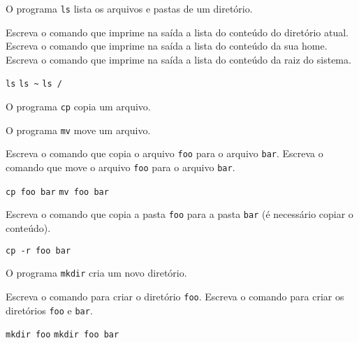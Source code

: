 \begin{Exercise}[label={0017}, difficulty={1}, origin={coreutils}]
  O programa \lstinline+ls+ lista os arquivos e pastas de um diretório.

  \Question Escreva o comando que imprime na saída a lista do conteúdo do
  diretório atual.
  \Question Escreva o comando que imprime na saída a lista do conteúdo da
  sua home.
  \Question Escreva o comando que imprime na saída a lista do conteúdo da
  raiz do sistema.
\end{Exercise}
\begin{Answer}[ref={0017}]
  \Question \lstinline+ls+
  \Question \lstinline+ls ~+
  \Question \lstinline+ls /+
\end{Answer}

\begin{Exercise}[label={0018}, difficulty={1}, origin={coreutils}]
  O programa \lstinline+cp+ copia um arquivo.

  O programa \lstinline+mv+ move um arquivo.

  \Question Escreva o comando que copia o arquivo \lstinline+foo+ para o
  arquivo \lstinline+bar+.
  \Question Escreva o comando que move o arquivo \lstinline+foo+ para o
  arquivo \lstinline+bar+.
\end{Exercise}
\begin{Answer}[ref={0018}]
  \Question \lstinline+cp foo bar+
  \Question \lstinline+mv foo bar+
\end{Answer}

\begin{Exercise}[label={0019}, difficulty={2}, origin={coreutils}]
  Escreva o comando que copia a pasta \lstinline+foo+ para a
  pasta \lstinline+bar+ (é necessário copiar o conteúdo).
\end{Exercise}
\begin{Answer}[ref={0019}]
  \Question \lstinline+cp -r foo bar+
\end{Answer}

\begin{Exercise}[label={0020}, difficulty={1}, origin={coreutils}]
  O programa \lstinline+mkdir+ cria um novo diretório.

  \Question Escreva o comando para criar o diretório \lstinline+foo+.
  \Question Escreva o comando para criar os diretórios \lstinline+foo+ e
  \lstinline+bar+.
\end{Exercise}
\begin{Answer}[ref={0020}]
  \Question \lstinline+mkdir foo+
  \Question \lstinline+mkdir foo bar+
\end{Answer}

